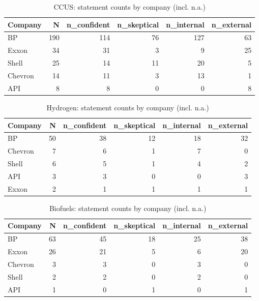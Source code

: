 \begin{table}
\caption{CCUS: statement counts by company (incl. n.a.)}
\label{tab:company-ccus}
\begin{tabular}{lrrrrr}
\toprule
Company & N & n\_confident & n\_skeptical & n\_internal & n\_external \\
\midrule
BP & 190 & 114 & 76 & 127 & 63 \\
Exxon & 34 & 31 & 3 & 9 & 25 \\
Shell & 25 & 14 & 11 & 20 & 5 \\
Chevron & 14 & 11 & 3 & 13 & 1 \\
API & 8 & 8 & 0 & 0 & 8 \\
\bottomrule
\end{tabular}
\end{table}

\begin{table}
\caption{Hydrogen: statement counts by company (incl. n.a.)}
\label{tab:company-hydrogen}
\begin{tabular}{lrrrrr}
\toprule
Company & N & n\_confident & n\_skeptical & n\_internal & n\_external \\
\midrule
BP & 50 & 38 & 12 & 18 & 32 \\
Chevron & 7 & 6 & 1 & 7 & 0 \\
Shell & 6 & 5 & 1 & 4 & 2 \\
API & 3 & 3 & 0 & 0 & 3 \\
Exxon & 2 & 1 & 1 & 1 & 1 \\
\bottomrule
\end{tabular}
\end{table}

\begin{table}
\caption{Biofuels: statement counts by company (incl. n.a.)}
\label{tab:company-biofuels}
\begin{tabular}{lrrrrr}
\toprule
Company & N & n\_confident & n\_skeptical & n\_internal & n\_external \\
\midrule
BP & 63 & 45 & 18 & 25 & 38 \\
Exxon & 26 & 21 & 5 & 6 & 20 \\
Chevron & 3 & 3 & 0 & 3 & 0 \\
Shell & 2 & 2 & 0 & 2 & 0 \\
API & 1 & 0 & 1 & 0 & 1 \\
\bottomrule
\end{tabular}
\end{table}

